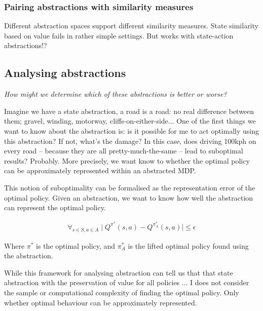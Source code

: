 \subsubsection{Pairing abstractions with similarity measures}

Different abstraction spaces support different similarity measures.
State similarity based on value fails in rather simple settings.
But works with state-action abstractions!?



\subsection{Analysing abstractions}

\begin{displayquote}
\textit{How might we determine which of these abstractions is better or worse?}
\end{displayquote}

Imagine we have a state abstraction, a road is a road: no real difference
between them; gravel, winding, motorway, cliffs-on-either-side...
One of the first things we want to know about the abstraction is:
is it possible for me to act optimally
using this abstraction? If not, what's the damage? In this case, does driving 100kph on every road --
because they are all pretty-much-the-same -- lead to suboptimal results? Probably.
More precisely, we want know to whether the optimal policy can be approximately represented within an abstracted MDP.

This notion of suboptimality can be formalised as the representation error of the optimal
policy. Given an abstraction, we want to know how well
the abstraction can represent the optimal policy.

\begin{align}
\forall_{s\in S, a\in A} \mid Q^{\pi^* }(s, a) - Q^{\pi_{A}^* }(s, a) \mid \le \epsilon
\end{align}

Where $\pi^{* }$ is the optimal policy, and $\pi_{A}^{* }$ is the lifted optimal
policy found using the abstraction.

While this framework \cite{Littman2006, Abel2017} for analysing
abstraction can tell us that that state abstraction with the preservation of value for all policies
 ...
I does not consider the sample or computational complexity of finding the optimal policy.
Only whether optimal behaviour can be approximately represented.

